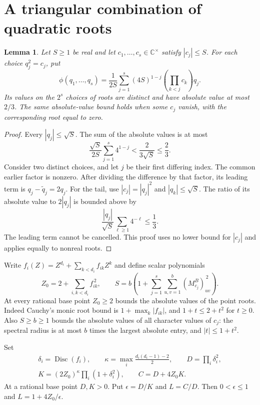 \documentclass[11pt,a4paper]{article}
\newtheorem{lemma}[theorem]{Lemma}
\DeclareMathOperator{\Disc}{Disc}\DeclareMathOperator{\supp}{supp}
\begin{document}
\section{A triangular combination of quadratic roots}
\begin{lemma}\label{lem:triangular}
Let $S\ge1$ be real and let $c_1,\ldots,c_s\in\mathbb C^\times$ satisfy
$|c_j|\le S$. For each choice $q_j^2=c_j$, put
\[
 \phi(q_1,\ldots,q_s)
 =\frac1{2S}\sum_{j=1}^s(4S)^{1-j}
       \left(\prod_{k<j}c_k\right)q_j.
\]
Its values on the $2^s$ choices of roots are distinct and have absolute
value at most $2/3$. The same absolute-value bound holds when some
$c_j$ vanish, with the corresponding root equal to zero.
\end{lemma}
\begin{proof}
Every $|q_j|\le\sqrt S$. The sum of the absolute values is at most
\[
 \frac{\sqrt S}{2S}\sum_{j=1}^s4^{1-j}
 <\frac{2}{3\sqrt S}\le\frac23.
\]
Consider two distinct choices, and let $j$ be their first differing index.
The common earlier factor is nonzero. After dividing the difference by
that factor, its leading term is $q_j-\widetilde q_j=2q_j$. For the tail,
use $|c_j|=|q_j|^2$ and $|q_k|\le\sqrt S$. The ratio of its absolute
value to $2|q_j|$ is bounded above by
\[
 \frac{|q_j|}{\sqrt S}\sum_{\ell\ge1}4^{-\ell}\le\frac13.
\]
The leading term cannot be cancelled. This proof uses no lower bound for
$|c_j|$ and applies equally to nonreal roots.
\end{proof}

Write $f_i(Z)=Z^{d_i}+\sum_{k<d_i}f_{ik}Z^k$ and define scalar polynomials
\begin{equation}\label{eq:bounds}
 Z_0=2+\sum_{i,k<d_i}f_{ik}^{\,2},\qquad
 S=b\left(1+\sum_{j=1}^s\sum_{u,v=1}^b(M_{c_j}^B)_{uv}^{\,2}\right).
\end{equation}
At every rational base point $Z_0\ge2$ bounds the absolute values of the
point roots. Indeed Cauchy's monic root bound is $1+\max_k|f_{ik}|$,
and $1+t\le2+t^2$ for $t\ge0$. Also $S\ge b\ge1$ bounds the absolute
values of all character values of $c_j$: the spectral radius is at most
$b$ times the largest absolute entry, and $|t|\le1+t^2$.

Set
\begin{gather*}
 \delta_i=\Disc(f_i),\qquad
 \kappa=\max_i\frac{d_i(d_i-1)-2}{2},\qquad
 D=\prod_i\delta_i^2,\\
 K=(2Z_0)^\kappa\prod_i(1+\delta_i^2),\qquad C=D+4Z_0K.
\end{gather*}
At a rational base point $D,K>0$. Put $\epsilon=D/K$ and $L=C/D$.
Then $0<\epsilon\le1$ and $L=1+4Z_0/\epsilon$.
\end{document}
